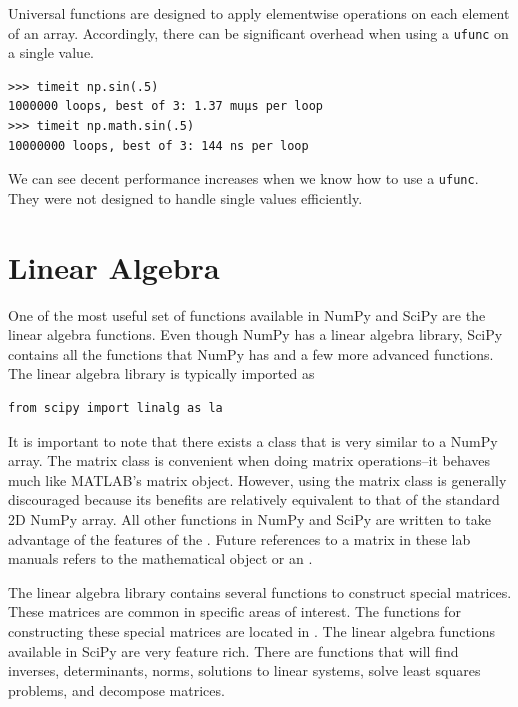 Universal functions are designed to apply elementwise operations on each 
element of an array. Accordingly, there can be significant overhead 
when using a \texttt{ufunc} on a single value.

\begin{lstlisting}
>>> timeit np.sin(.5)
1000000 loops, best of 3: 1.37 muµs per loop
>>> timeit np.math.sin(.5)
10000000 loops, best of 3: 144 ns per loop
\end{lstlisting}

We can see decent performance increases when we know how to use a 
\texttt{ufunc}. They were not designed to handle single values efficiently.

\section*{Linear Algebra}
One of the most useful set of functions available in NumPy and SciPy are the 
linear algebra functions. Even though NumPy has a linear algebra library, 
SciPy contains all the functions that NumPy has and a few more advanced 
functions. The linear algebra library is typically imported as

\begin{lstlisting}
from scipy import linalg as la
\end{lstlisting}

It is important to note that there exists a  class that is very 
similar to a NumPy array. The matrix class is convenient when doing matrix 
operations--it behaves much like MATLAB's matrix object.
However, using the matrix class is generally discouraged because its benefits 
are relatively equivalent to that of the standard 2D NumPy array. 
All other functions in NumPy and SciPy are written to take advantage 
of the features of the . Future references to a matrix in these lab 
manuals refers to the mathematical object or an .

The linear algebra library contains several functions to construct special 
matrices. These matrices are common in specific areas of interest.
The functions for constructing these special matrices are located in 
. The linear algebra functions available in SciPy 
are very feature rich. There are functions that will find inverses, 
determinants, norms, solutions to linear systems, solve least squares 
problems, and decompose matrices.

